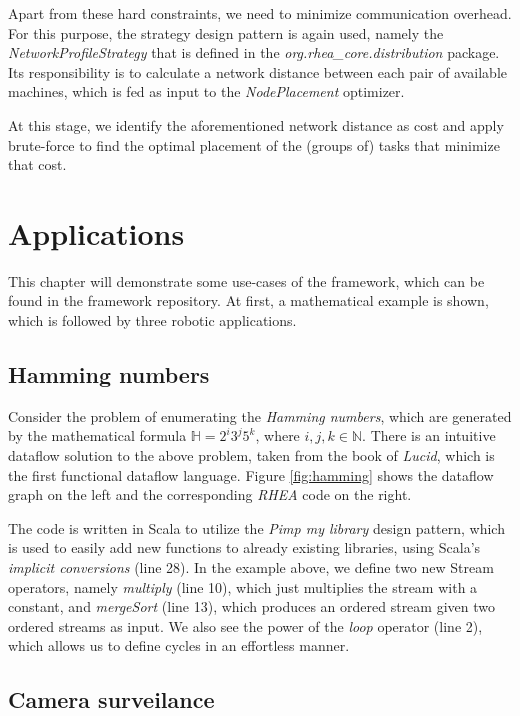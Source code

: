 \documentclass[sigplan,review,anonymous]{acmart}\settopmatter{printfolios=true}
\begin{document}
Apart from these hard constraints, we need to minimize communication overhead. For this purpose, the strategy design pattern is again used, namely the \textit{NetworkProfileStrategy} that is defined in the \textit{org.rhea\_core.distribution} package. Its responsibility is to calculate a network distance between each pair of available machines, which is fed as input to the \textit{NodePlacement} optimizer. 

At this stage, we identify the aforementioned network distance as cost and apply brute-force to find the optimal placement of the (groups of) tasks that minimize that cost.

\section{Applications}
This chapter will demonstrate some use-cases of the framework, which can be found in the framework repository. At first, a mathematical example is shown, which is followed by three robotic applications. 

\subsection{Hamming numbers}
Consider the problem of enumerating the \textit{Hamming numbers}, which are generated by the mathematical formula $\mathbb{H} = 2^i3^j5^k$, where $i,j,k \in \mathbb{N}$. There is an intuitive dataflow solution to the above problem, taken from the book of \textit{Lucid}, which is the first functional dataflow language\cite{lucid}. Figure \ref{fig:hamming} shows the dataflow graph on the left and the corresponding \textit{RHEA} code on the right.


The code is written in Scala to utilize the \textit{Pimp my library} design pattern\cite{pimp}, which is used to easily add new functions to already existing libraries, using Scala's \textit{implicit conversions} (line 28). In the example above, we define two new Stream operators, namely \textit{multiply} (line 10), which just multiplies the stream with a constant, and \textit{mergeSort} (line 13), which produces an ordered stream given two ordered streams as input. We also see the power of the \textit{loop} operator (line 2), which allows us to define cycles in an effortless manner.

\subsection{Camera surveilance}
\end{document}
